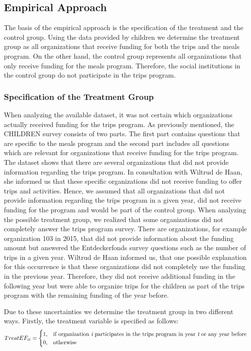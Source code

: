 \documentclass[12pt, a4paper, titlepage]{article}\usepackage[]{graphicx}\usepackage[]{color}
\begin{document}
\subsection{Empirical Approach}

The basis of the empirical approach is the specification of the treatment and the control group. Using the data provided by children we determine the treatment group as all organizations that receive funding for both the trips and the meals program. On the other hand, the control group represents all organizations that only receive funding for the meals program. Therefore, the social institutions in the control group do not participate in the trips program.

\subsubsection{Specification of the Treatment Group}

When analyzing the available dataset, it was not certain which organizations actually received funding for the trips program. As previously mentioned, the CHILDREN survey consists of two parts. The first part contains questions that are specific to the meals program and the second part includes all questions which are relevant for organizations that receive funding for the trips program. The dataset shows that there are several organizations that did not provide information regarding the trips program. In consultation with Wiltrud de Haan, she informed us that these specific organizations did not receive funding to offer trips and activities. Hence, we assumed that all organizations that did not provide information regarding the trips program in a given year, did not receive funding for the program and would be part of the control group. When analyzing the possible treatment group, we realized that some organizations did not completely answer the trips program survey. There are organizations, for example organization 103 in 2015, that did not provide information about the funding amount but answered the Entdeckerfonds survey questions such as the number of trips in a given year. Wiltrud de Haan informed us, that one possible explanation for this occurrence is that these organizations did not completely use the funding in the previous year. Therefore, they did not receive additional funding in the following year but were able to organize trips for the children as part of the trips program with the remaining funding of the year before.

Due to these uncertainties we determine the treatment group in two different ways. Firstly, the treatment variable is specified as follows:
\begin{equation}
TreatEF_{it} =
\begin{cases}
1, & \text{if organization \begin{itshape}{i}\end{itshape} participates in the trips program in year \begin{itshape}{t}\end{itshape} or any year before}\\
0, & \text{otherwise}
\end{cases}
\end{equation}
\end{document}

